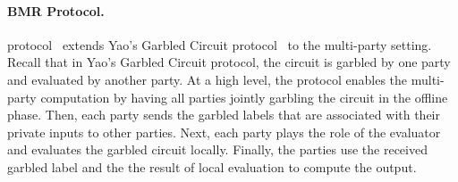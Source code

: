 \paragraph{BMR Protocol.}
\label{para:BMRProtocol}
\bmr protocol~\cite{beaver1990round} extends Yao's Garbled Circuit protocol~\cite{yao1986generate} to the multi-party setting. Recall that in Yao's Garbled Circuit protocol, the circuit is garbled by one party and evaluated by another party. At a high level, the \bmr protocol enables the multi-party computation by having all parties jointly garbling the circuit in the offline phase. Then, each party sends the garbled labels that are associated with their private inputs to other parties. Next, each party plays the role of the evaluator and evaluates the garbled circuit locally. Finally, the parties use the received garbled label and the the result of local evaluation to compute the output.








